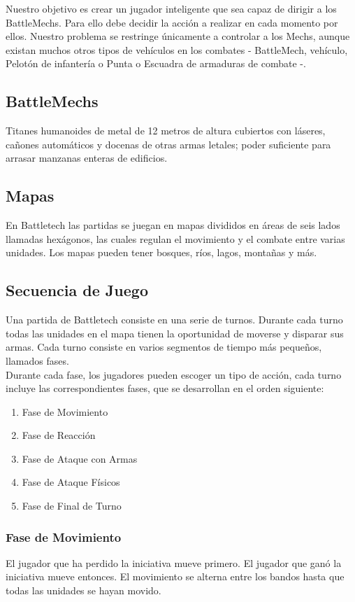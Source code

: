 \documentclass[a4paper,12pt,oneside]{book}
\begin{document}
Nuestro objetivo es crear un jugador inteligente que sea capaz de
dirigir a los BattleMechs. Para ello debe decidir la acción a
realizar en cada momento por ellos. Nuestro problema se restringe
únicamente a controlar a los Mechs, aunque existan muchos otros tipos
de vehículos en los combates - BattleMech, vehículo, Pelotón de
infantería o Punta o Escuadra de armaduras de combate -.

\subsection{BattleMechs}
Titanes humanoides de metal de 12 metros de altura cubiertos con
láseres, cañones automáticos y docenas de otras armas letales; poder
suficiente para arrasar manzanas enteras de edificios. 

\subsection{Mapas}

En Battletech las partidas se juegan en mapas divididos en áreas de
seis lados llamadas hexágonos, las cuales regulan el movimiento y el
combate entre varias unidades. Los mapas pueden tener bosques, ríos,
lagos, montañas y más.

\subsection{Secuencia de Juego}

Una partida de Battletech consiste en una serie de turnos. Durante
cada turno todas las unidades en el mapa tienen la oportunidad de
moverse y disparar sus armas. Cada turno consiste en varios
segmentos de tiempo más pequeños, llamados fases.\\

Durante cada fase, los jugadores pueden escoger un tipo de acción,
cada turno incluye las correspondientes fases, que se desarrollan en
el orden siguiente:
\begin{enumerate}
\item Fase de Movimiento
\item Fase de Reacción
\item Fase de Ataque con Armas
\item Fase de Ataque Físicos
\item Fase de Final de Turno
\end{enumerate}

\subsubsection{ Fase de Movimiento }
El jugador que ha perdido la iniciativa mueve primero. El jugador que
ganó la iniciativa mueve entonces. El movimiento se alterna entre los
bandos hasta que todas las unidades se hayan movido. \\
\end{document}
